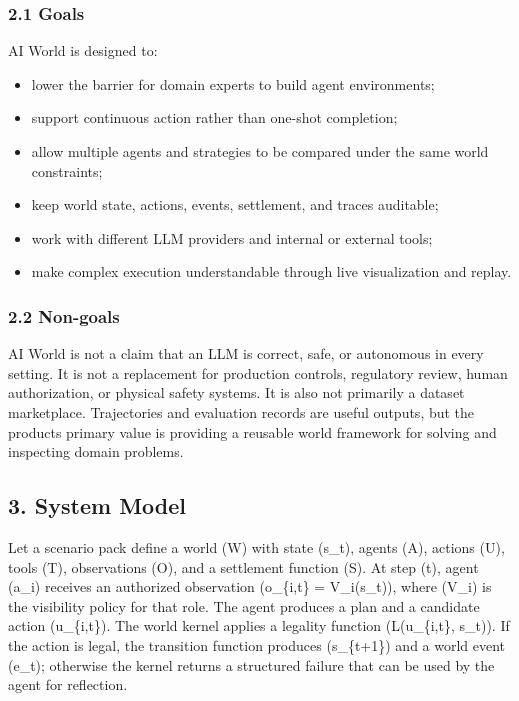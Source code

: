 \documentclass[
]{article}
\providecommand{\tightlist}{%
  \setlength{\itemsep}{0pt}\setlength{\parskip}{0pt}}
\begin{document}
\subsubsection{2.1 Goals}\label{21-goals}

AI World is designed to:

\begin{itemize}
\tightlist
\item
  lower the barrier for domain experts to build agent environments;
\item
  support continuous action rather than one-shot completion;
\item
  allow multiple agents and strategies to be compared under the same
  world constraints;
\item
  keep world state, actions, events, settlement, and traces auditable;
\item
  work with different LLM providers and internal or external tools;
\item
  make complex execution understandable through live visualization and
  replay.
\end{itemize}

\subsubsection{2.2 Non-goals}\label{22-non-goals}

AI World is not a claim that an LLM is correct, safe, or autonomous in
every setting. It is not a replacement for production controls,
regulatory review, human authorization, or physical safety systems. It
is also not primarily a dataset marketplace. Trajectories and evaluation
records are useful outputs, but the product\textquotesingle s primary
value is providing a reusable world framework for solving and inspecting
domain problems.

\subsection{3. System Model}\label{3-system-model}

Let a scenario pack define a world (W) with state (s\_t), agents (A),
actions (U), tools (T), observations (O), and a settlement function (S).
At step (t), agent (a\_i) receives an authorized observation (o\_\{i,t\}
= V\_i(s\_t)), where (V\_i) is the visibility policy for that role. The
agent produces a plan and a candidate action (u\_\{i,t\}). The world
kernel applies a legality function (L(u\_\{i,t\}, s\_t)). If the action
is legal, the transition function produces (s\_\{t+1\}) and a world
event (e\_t); otherwise the kernel returns a structured failure that can
be used by the agent for reflection.
\end{document}
